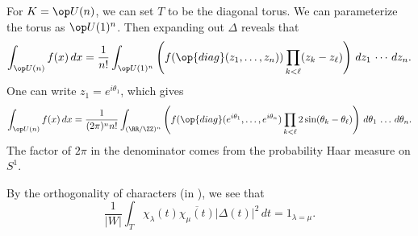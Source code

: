 \documentclass[../notes.tex]{subfiles}
\begin{document}
\begin{example}
	For $K=\op U(n)$, we can set $T$ to be the diagonal torus. We can parameterize the torus as $\op U(1)^n$. Then expanding out $\Delta$ reveals that
	\[\int_{\op U(n)}f(x)\,dx=\frac1{n!}\int_{\op U(1)^n}\left(f(\op{diag}(z_1,\ldots,z_n))\prod_{k<\ell}(z_k-z_\ell)\right)\,dz_1\,\cdots\,dz_n.\]
	One can write $z_1=e^{i\theta_1}$, which gives
	\[\int_{\op U(n)}f(x)\,dx=\frac1{(2\pi)^nn!}\int_{(\RR/\ZZ)^n}\left(f(\op{diag}(e^{i\theta_1},\ldots,e^{i\theta_n})\prod_{k<\ell}2\sin(\theta_k-\theta_\ell)\right)\,d\theta_1\,\ldots\,d\theta_n.\]
	The factor of $2\pi$ in the denominator comes from the probability Haar measure on $S^1$.
\end{example}
\begin{remark} \label{rem:ortho-character-integration}
	By the orthogonality of characters (in ), we see that
	\[\frac1{\left|W\right|}\int_T\chi_\lambda(t)\overline{\chi_\mu(t)}\left|\Delta(t)\right|^2\,dt=1_{\lambda=\mu}.\]
\end{remark}
\end{document}
